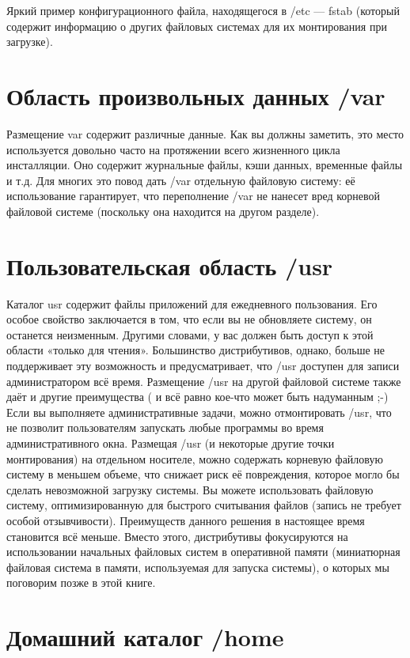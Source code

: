 \documentclass[10pt]{book}
\begin{document}
Яркий пример конфигурационного файла, находящегося в /etc — fstab (который содержит информацию о других файловых системах для их монтирования при загрузке).

\section{Область произвольных данных /var}

Размещение var содержит различные данные. Как вы должны заметить, это место используется довольно часто на протяжении всего жизненного цикла инсталляции. Оно содержит журнальные файлы, кэши данных, временные файлы и т.д.
Для многих это повод дать /var отдельную файловую систему: её использование гарантирует, что переполнение /var не нанесет вред корневой файловой системе (поскольку она находится на другом разделе).

\section{Пользовательская область /usr}

Каталог usr  содержит файлы приложений для ежедневного пользования. Его особое свойство заключается в том, что если вы не обновляете систему, он останется неизменным. Другими словами, у вас должен быть доступ к этой области «только для чтения». Большинство дистрибутивов, однако, больше не поддерживает эту возможность и предусматривает, что /usr доступен для записи администратором всё время.
Размещение /usr на другой файловой системе также даёт и другие преимущества ( и всё равно кое-что может быть надуманным ;-)
Если вы выполняете административные задачи, можно отмонтировать /usr, что не позволит пользователям запускать любые программы во время административного окна. 
Размещая /usr (и некоторые другие точки монтирования) на отдельном носителе, можно содержать корневую файловую систему в меньшем объеме, что снижает риск её повреждения, которое могло бы сделать невозможной загрузку системы.
Вы можете использовать файловую систему, оптимизированную для быстрого считывания файлов (запись не требует особой отзывчивости).
Преимуществ данного решения в настоящее время становится всё меньше. Вместо этого, дистрибутивы фокусируются на использовании начальных  файловых систем в оперативной памяти (миниатюрная файловая система в  памяти, используемая для запуска системы), о которых мы поговорим позже в этой книге.   

\section{Домашний каталог /home}
\end{document}

